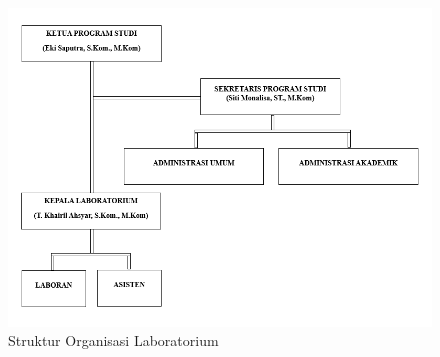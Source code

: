 \begin{figure}
  \centering
  \includegraphics[width=0.82\linewidth]{konten//gambar/Struktur Organisasi.png}
  \caption{Struktur Organisasi Laboratorium}
  \label{fig:enter-label}
\end{figure}
